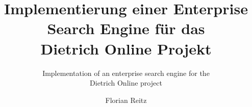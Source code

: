 \documentclass[envcountsame,envcountchap, deutsch]{i-studis}
\begin{document}
\title{Implementierung einer Enterprise Search Engine für das \\ Dietrich Online Projekt}
\subtitle{ Implementation of an enterprise search engine for the \\ Dietrich Online project }
\author{ Florian Reitz } 							%
\address{Trier, den 15.10.2019} 							%
\begingroup
  \renewcommand{\thepage}{Titel}
  \mytitlepage
  \newpage
\endgroup
\frontmatter 
\tableofcontents 						%
\listoffigures 							%
\listoftables 							%
\mainmatter                        		%

%





\backmatter                        		%
\printindex 							%
\begin{appendix}						%
\end{appendix}
\end{document}
